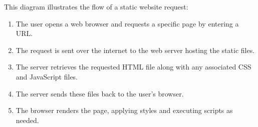 \vspace*{1cm}

This diagram illustrates the flow of a static website request:
\begin{enumerate}
    \item The user opens a web browser and requests a specific page by entering a URL.\ 
    \item The request is sent over the internet to the web server hosting the static files.
    \item The server retrieves the requested HTML file along with any associated CSS and JavaScript files.
    \item The server sends these files back to the user's browser.
    \item The browser renders the page, applying styles and executing scripts as needed.
\end{enumerate}

